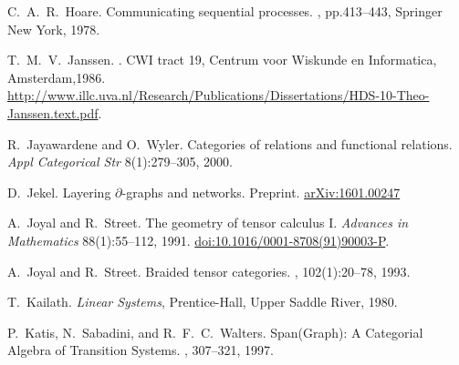 \begin{thebibliography}{RSW00}
    

    C.\ A.\ R.\ Hoare.
    \newblock Communicating sequential processes.
    , pp.413--443, Springer New York, 1978.
    
    T.\ M.\ V.\ Janssen.
    . CWI tract 19, Centrum voor
    Wiskunde en Informatica, Amsterdam,1986.
    \newblock
    \href{http://www.illc.uva.nl/Research/Publications/Dissertations/HDS-10-Theo-Janssen.text.pdf}{http://www.illc.uva.nl/Research/Publications/Dissertations/HDS-10-Theo-Janssen.text.pdf}.
    
    R.\ Jayawardene and O.\ Wyler.
    \newblock Categories of relations and functional relations.
    \newblock \emph{Appl Categorical Str} 8(1):279--305, 2000.
    
    D.\ Jekel.
    \newblock Layering $\partial$-graphs and networks. 
    \newblock Preprint.
    \newblock \href{http://arxiv.org/abs/1601.00247}{arXiv:1601.00247}

    A.\ Joyal and R.\ Street.
    \newblock The geometry of tensor calculus I.
    \newblock \emph{Advances in Mathematics} { 88}(1):55--112, 1991.
    \newblock \href{http://doi.org/10.1016/0001-8708(91)90003-P}{doi:10.1016/0001-8708(91)90003-P}.

    A.\ Joyal and R.\ Street.
    \newblock Braided tensor categories.
    , { 102}(1):20--78, 1993.

    T.\ Kailath.
    \newblock \emph{Linear Systems}, Prentice-Hall, Upper Saddle River, 1980.

    P.\ Katis, N.\ Sabadini, and R.\ F.\ C.\ Walters.
    \newblock Span(Graph): A Categorial Algebra of Transition Systems.
    , 307--321, 1997. 


\end{thebibliography}
